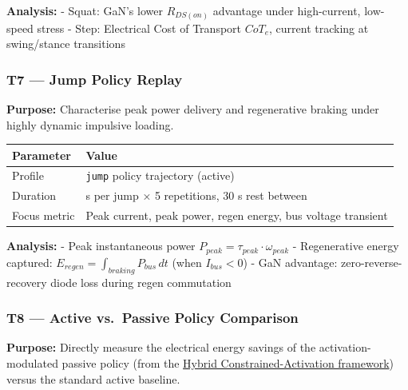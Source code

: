 \documentclass[
]{article}
\newcounter{none} %
\begin{document}
\textbf{Analysis:} - Squat: GaN's lower \(R_{DS(on)}\) advantage under
high-current, low-speed stress - Step: Electrical Cost of Transport
\(CoT_e\), current tracking at swing/stance transitions

\subsubsection{T7 --- Jump Policy Replay}\label{t7-jump-policy-replay}

\textbf{Purpose:} Characterise peak power delivery and regenerative
braking under highly dynamic impulsive loading.

{\def\LTcaptype{none} %
\begin{longtable}[]{@{}
  >{\raggedright\arraybackslash}p{}
  >{\raggedright\arraybackslash}p{}@{}}
\toprule\noalign{}
\begin{minipage}[b]{\linewidth}\raggedright
Parameter
\end{minipage} & \begin{minipage}[b]{\linewidth}\raggedright
Value
\end{minipage} \\
\midrule\noalign{}
\endhead
\bottomrule\noalign{}
\endlastfoot
Profile & \texttt{jump} policy trajectory (active) \\
Duration & 2 s per jump × 5 repetitions, 30 s rest between \\
Focus metric & Peak current, peak power, regen energy, bus voltage
transient \\
\end{longtable}
}

\textbf{Analysis:} - Peak instantaneous power
\(P_{peak} = \tau_{peak} \cdot \omega_{peak}\) - Regenerative energy
captured: \(E_{regen} = \int_{braking} P_{bus} \, dt\) (when
\(I_{bus} < 0\)) - GaN advantage: zero-reverse-recovery diode loss
during regen commutation

\subsubsection{T8 --- Active vs.~Passive Policy
Comparison}\label{t8-active-vs.-passive-policy-comparison}

\textbf{Purpose:} Directly measure the electrical energy savings of the
activation-modulated passive policy (from the
\href{../../MuJoCo/docs/passive_policy_research.md}{Hybrid
Constrained-Activation framework}) versus the standard active baseline.
\end{document}
